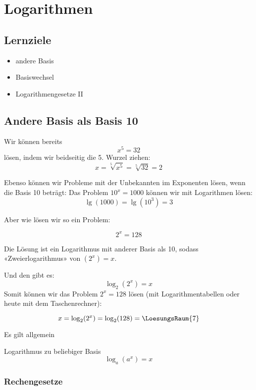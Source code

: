
\section{Logarithmen}
\subsection*{Lernziele}

\begin{itemize}
\item andere Basis
\item Basiswechsel
\item Logarithmengesetze II
\end{itemize}
\newpage

\subsection{Andere Basis als Basis 10}

Wir können bereits $$x^5=32$$ lösen, indem wir beidseitig die 5. Wurzel ziehen: $$x = \sqrt[5]{x^5} = \sqrt[5]{32} = 2$$

Ebenso können wir Probleme mit der Unbekannten im Exponenten lösen, wenn die Basis 10 beträgt: Das Problem $10^x = 1000$ können wir mit Logarithmen lösen: $$\lg(1000) = \lg(10^3) = 3$$

Aber wie lösen wir so ein Problem:

$$2^x = 128$$

Die Lösung ist ein Logarithmus mit anderer Basis als 10, sodass «Zweierlogarithmus» von $(2^x) = x$.

Und den gibt es:
$$\log_2(2^x) = x$$
Somit können wir das Problem $2^x=128$ lösen (mit Logarithmentabellen oder heute mit dem Taschenrechner):

$$x = \log_2(2^x) = \log_2(128) = \LoesungsRaum{7}$$

Es gilt allgemein

\begin{gesetz}{Logarithmus zu beliebiger Basis}{}
  $$\log_a(a^x) = x$$
\end{gesetz}
\newpage

\subsubsection{Rechengesetze}

